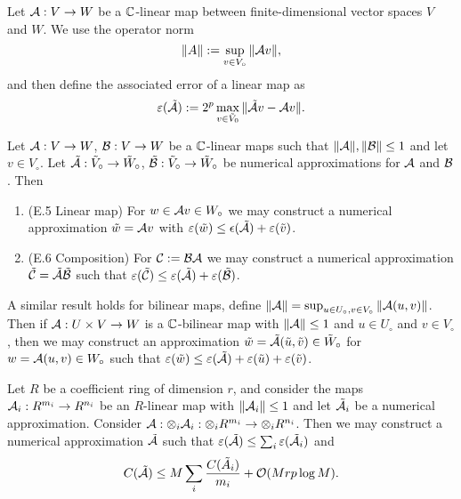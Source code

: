 Let $\mathcal A: V \to W$ be a ${\mathbb C}$-linear map between finite-dimensional vector spaces $V$ and $W$. We use the operator norm
\[
    \|A\| := \sup_{v \in V_\circ} \|\mathcal Av\|,
\]
and then define the associated error of a linear map as
\[
    \varepsilon(\tilde{\mathcal A}) := 2^p \max_{v \in \tilde{V}_0} \|\tilde{\mathcal A}v - \mathcal Av\|.
\]
\begin{proposition}
    Let $\mathcal A: V \to W$, $\mathcal B: V \to W$ be a ${\mathbb C}$-linear maps such that $\|\mathcal A\|, \|\mathcal B\| \le 1$ and let $v \in V_\circ$. Let $\tilde{\mathcal A}: \tilde{V}_\circ \to \tilde{W}_\circ$, $\tilde{\mathcal B}: \tilde{V}_\circ \to \tilde{W}_\circ$ be numerical approximations for $\mathcal A$ and $\mathcal B$. Then

    \begin{enumerate}
        \item (E.5 Linear map) For $w \in \mathcal Av \in W_\circ$ we may construct a numerical approximation $\tilde{w} = \mathcal Av$ with $\varepsilon(\tilde{w}) \le \epsilon(\tilde{\mathcal A}) + \varepsilon(\tilde{v})$.
        \item (E.6 Composition) For $\mathcal C := \mathcal B\mathcal A$ we may construct a numerical approximation $\tilde{\mathcal C} = \tilde{\mathcal A}\tilde{\mathcal B}$ such that $\varepsilon(\tilde{\mathcal C}) \le \varepsilon(\tilde{\mathcal A}) + \varepsilon(\tilde{\mathcal B})$.
    \end{enumerate}
\end{proposition}

A similar result holds for bilinear maps, define $\|\mathcal A\| = \sup_{u \in U_\circ, v \in V_\circ} \|\mathcal A(u, v)\|$.
Then if $\mathcal A: U \times V \to W$ is a ${\mathbb C}$-bilinear map with $\|\mathcal A\| \le 1$ and $u \in U_\circ$ and $v \in V_\circ$, then we may construct an approximation $\tilde{w} = \tilde{\mathcal A}(\tilde{u}, \tilde{v}) \in \tilde{W}_\circ$ for $w = \mathcal A(u, v) \in W_\circ$ such that $\varepsilon(\tilde{w}) \le \varepsilon(\tilde{\mathcal A}) + \varepsilon(\tilde{u}) + \varepsilon(\tilde{v})$.

\begin{lemma}
    Let $R$ be a coefficient ring of dimension $r$, and consider the maps $\mathcal A_i : R^{m_i} \to R^{n_i}$ be an $R$-linear map with $\|\mathcal A_i\| \le 1$ and let $\tilde{\mathcal A_i}$ be a numerical approximation. Consider $\mathcal A: \otimes_i \mathcal A_i : \otimes_i R^{m_i} \to \otimes_i R^{n_i}$. Then we may construct a numerical approximation $\tilde{\mathcal A}$ such that $\varepsilon(\tilde{\mathcal A}) \le \sum_i \varepsilon(\tilde{\mathcal A}_i)$ and
    \[
        C(\tilde{\mathcal A}) \le M \sum_i\frac{C(\tilde{A}_i)}{m_i} + \mathcal O(Mrp \log M).
    \]
\end{lemma}

